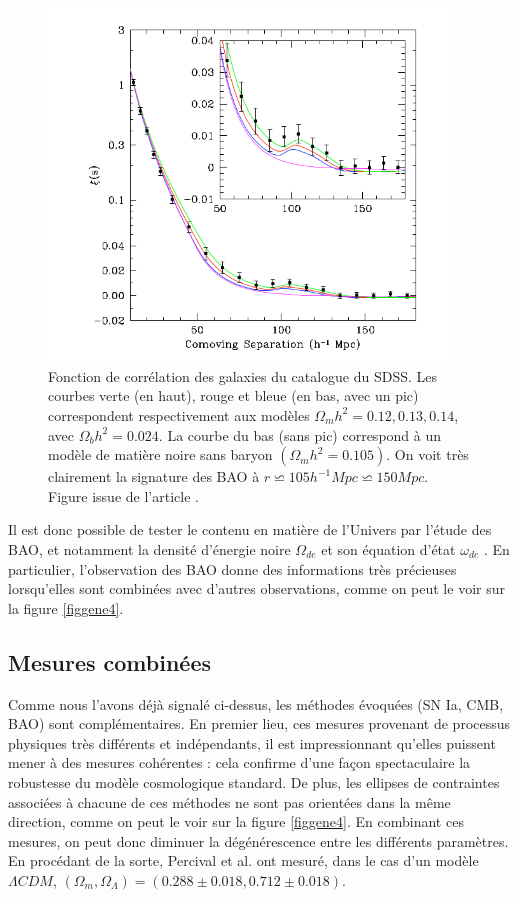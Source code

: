 \documentclass[a4paper,12pt]{report}
\theoremstyle{plain}
\theoremstyle{plain}
\begin{document}
\begin{figure}[h]
\includegraphics[width=25pc]{figgene3.png}
\caption{\label{figgene3} Fonction de corr\'elation des galaxies du catalogue du SDSS. Les courbes verte
(en haut), rouge et bleue (en bas, avec un pic) correspondent respectivement aux mod\`eles
 $ \Omega_m h^2 =  0.12, 0.13, 0.14$, avec $ \Omega_b h^2 = 0.024 $. La courbe du bas (sans pic) correspond \`a un
mod\`ele de mati\`ere noire sans baryon $ ( \Omega_m h^2 = 0.105) $. On voit tr\`es clairement la signature
des BAO \`a $ r \backsimeq 105h^{-1}Mpc \backsimeq 150Mpc $. Figure issue de l'article  \cite{115}.
 }
\end{figure}

Il est donc possible de tester le contenu en mati\`ere de l'Univers par l'\'etude des BAO,
et notamment la densit\'e d'\'energie noire $ \Omega_{de} $ et son \'equation d'\'etat $ \omega_{de} $ . En particulier,
l'observation des BAO donne des informations tr\`es pr\'ecieuses lorsqu'elles sont combin\'ees
avec d'autres observations, comme on peut le voir sur la figure \ref{figgene4}.
 
 \subsection{Mesures combin\'ees}
 Comme nous l'avons d\'ej\`a signal\'e ci-dessus, les m\'ethodes \'evoqu\'ees (SN Ia, CMB, BAO)
sont compl\'ementaires. En premier lieu, ces mesures provenant de processus physiques tr\`es 
diff\'erents et ind\'ependants, il est impressionnant qu'elles puissent mener \`a des mesures 
coh\'erentes : cela confirme d'une fa\c{c}on spectaculaire la robustesse du mod\`ele cosmologique
standard. De plus, les ellipses de contraintes associ\'ees \`a chacune de ces m\'ethodes ne sont
pas orient\'ees dans la m\^eme direction, comme on peut le voir sur la figure \ref{figgene4}. En combinant
ces mesures, on peut donc diminuer la d\'eg\'en\'erescence entre les diff\'erents param\`etres. En
proc\'edant de la sorte, Percival et al. \cite{212} ont mesur\'e, dans le cas d'un mod\`ele $ \Lambda CDM $,
$ (\Omega_m , \Omega_\Lambda ) = (0.288 \pm 0.018, 0.712  \pm 0.018)$.
\end{document}
